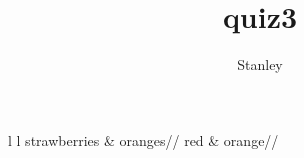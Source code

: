 \documentclass[10pt,a4paper]{article}
\author{Stanley}
\title{quiz3}
\begin{document}
\begin{table}[h!]
\begin{tabular}{l l}
strawberries & oranges//
\hline
red & orange//
\end{tabular}
\end{table}
\end{document}
